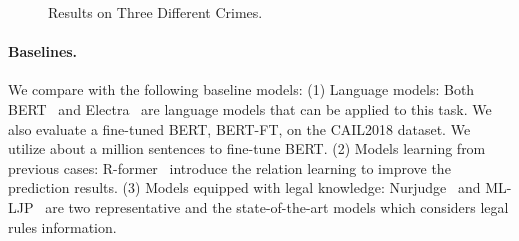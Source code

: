 \begin{figure}
\vfill
\hspace{0.001\linewidth}
\hspace{0.001\linewidth}
\hspace{0.001\linewidth}
    \vspace{-1em}

\caption{Results on Three Different Crimes.
}
\label{fig:over}
\vspace{-0.5em}
\end{figure}

\paragraph{Baselines.}
We compare with the following baseline models: (1) Language models: Both BERT~\cite{devlin-etal-2019-bert} and Electra~\cite{DBLP:conf/iclr/ClarkLLM20} are language models that can be applied to this task. We also evaluate a fine-tuned BERT, BERT-FT, on the CAIL2018 dataset. We utilize about a million sentences to fine-tune BERT. (2) Models learning from previous cases: R-former~\cite{Rformer} introduce the relation learning to improve the prediction results. (3) Models equipped with legal knowledge: Nurjudge~\cite{neurjudge} and ML-LJP~\cite{ML-LJP} are two representative and the state-of-the-art models which considers legal rules information.

